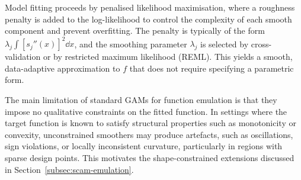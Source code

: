 Model fitting proceeds by penalised likelihood maximisation, where a roughness penalty is added to the log-likelihood to control the complexity of each smooth component and prevent overfitting.
The penalty is typically of the form $\lambda_j \int [s_j''(x)]^2 \dd x$, and the smoothing parameter $\lambda_j$ is selected by cross-validation or by restricted maximum likelihood (REML).
This yields a smooth, data-adaptive approximation to $f$ that does not require specifying a parametric form.

The main limitation of standard GAMs for function emulation is that they impose no qualitative constraints on the fitted function.
In settings where the target function is known to satisfy structural properties such as monotonicity or convexity, unconstrained smoothers may produce artefacts, such as oscillations, sign violations, or locally inconsistent curvature, particularly in regions with sparse design points.
This motivates the shape-constrained extensions discussed in Section~\ref{subsec:scam-emulation}.